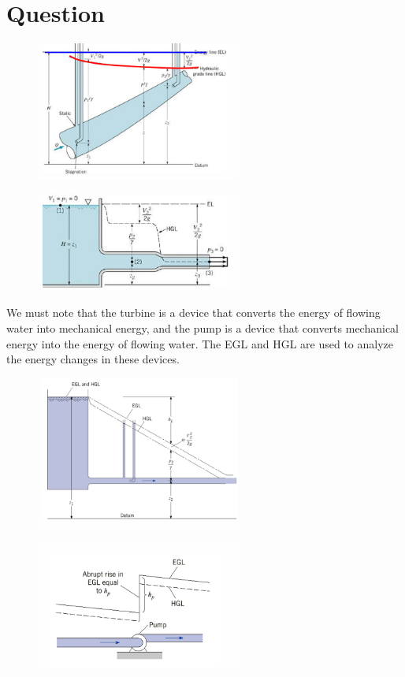 \documentclass[12pt,a4paper]{article}
\newcounter{question}
\newenvironment{questions}{
    \setcounter{question}{0}
    \section*{Question}
    \begin{enumerate}[leftmargin=1.5em,label={\arabic*．}]
}{
    \end{enumerate}
}
\begin{document}
\begin{questions}
  \begin{figure}[H]
    \centering
    \includegraphics[width=0.6\textwidth]{./figures/6.png}
  \end{figure}

  \begin{figure}[H]
    \centering
    \includegraphics[width=0.6\textwidth]{./figures/7.png}
  \end{figure}

  We must note that the turbine is a device that converts the energy of flowing water into mechanical energy, and the pump is a device that converts mechanical energy into the energy of flowing water. The EGL and HGL are used to analyze the energy changes in these devices.
  \begin{figure}[H]
    \centering
    \includegraphics[width=0.6\textwidth]{./figures/13.png}
  \end{figure}

  \begin{figure}[H]
    \centering
    \includegraphics[width=0.6\textwidth]{./figures/14.png}
  \end{figure}


\end{questions}
\end{document}
